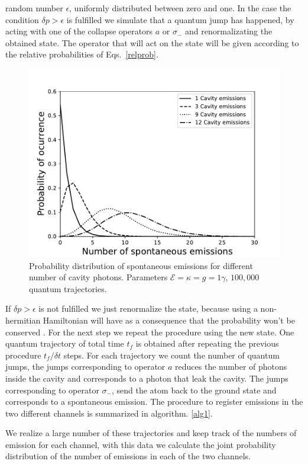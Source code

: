 \documentclass[%
 reprint,
 amsmath,amssymb,
 aps, 
]{revtex4-1}
\begin{document}
random number $\epsilon$, uniformly distributed between zero and one.
In the case the condition $\delta p > \epsilon$ is fulfilled we
simulate that a quantum jump has happened, by acting with one of the
collapse operators $a$ or $\sigma_-$ and renormalizating the obtained
state. The operator that will act on the state will be given according
to the relative probabilities of Eqs.~\eqref{relprob}.
\begin{figure}[!t] 
\centering
\includegraphics[scale = 0.5]{distributioneng.pdf}
\caption{Probability distribution of spontaneous emissions for
  different number of cavity photons. Parameters $\mathcal{E}  =
  \kappa =  g = 1\gamma$, $100,000$ quantum trajectories. } \label{probdiss}
\end{figure}
If $\delta p > \epsilon$ is not fulfilled we just renormalize the
state, because using a non-hermitian Hamiltonian will have as a
consequence that the probability won't be conserved
\cite{Sakurai:1167961}. For the next step we repeat the procedure
using the new state. One quantum trajectory of total time $t_f$ is
obtained after repeating the previous procedure $t_f/\delta t$ steps.
For each trajectory we count the number of quantum jumps, the jumps
corresponding to operator $a$ reduces the number of photons inside the
cavity and corresponds to a photon that leak the cavity. The jumps
corresponding to operator $\sigma_-$, send the atom back to the ground
state and corresponds to a spontaneous emission. The procedure to
register emissions in the two different channels is summarized in
algorithm. \ref{alg1}.

We realize a large number of these trajectories and keep track of the
numbers of emission for each channel, with this data we calculate
the joint probability distribution of the number of emissions in each
of the two channels.
\end{document}

